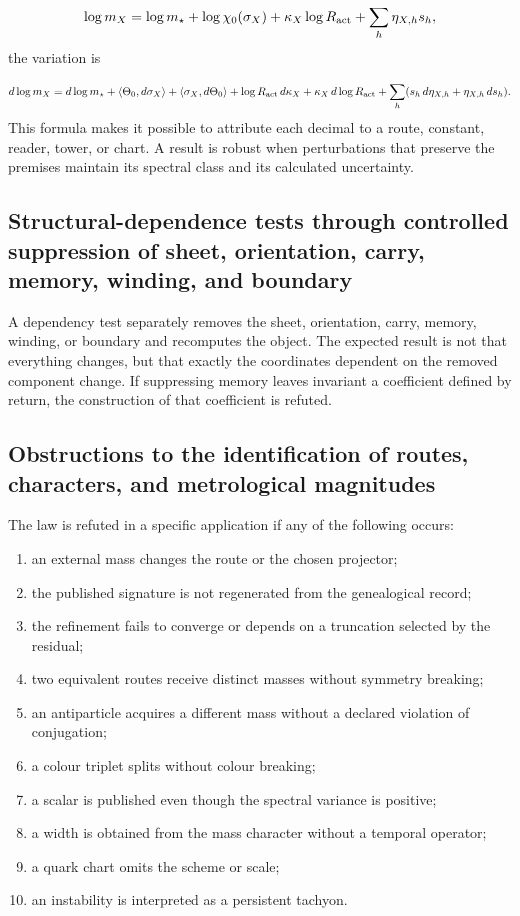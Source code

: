 \[
 \log m_X=
 \log m_\star+
 \log\chi_0(\sigma_X)
 +\kappa_X\log R_{\rm act}
 +\sum_h\eta_{X,h}s_h,
\]
the variation is

\[
 d\log m_X
 =d\log m_\star
 +\langle\Theta_0,d\sigma_X\rangle
 +\langle\sigma_X,d\Theta_0\rangle
 +\log R_{\rm act}\,d\kappa_X
 +\kappa_X\,d\log R_{\rm act}
 +\sum_h(s_h\,d\eta_{X,h}+\eta_{X,h}\,ds_h).
\]
This formula makes it possible to attribute each decimal to a route, constant, reader, tower, or chart. A result is robust when perturbations that preserve the premises maintain its spectral class and its calculated uncertainty.

\subsection{Structural-dependence tests through controlled suppression of sheet, orientation, carry, memory, winding, and boundary}
A dependency test separately removes the sheet, orientation, carry, memory, winding, or boundary and recomputes the object. The expected result is not that everything changes, but that exactly the coordinates dependent on the removed component change. If suppressing memory leaves invariant a coefficient defined by return, the construction of that coefficient is refuted.

\subsection{Obstructions to the identification of routes, characters, and metrological magnitudes}
The law is refuted in a specific application if any of the following occurs:

\begin{enumerate}
\item an external mass changes the route or the chosen projector;
\item the published signature is not regenerated from the genealogical record;
\item the refinement fails to converge or depends on a truncation selected by the residual;
\item two equivalent routes receive distinct masses without symmetry breaking;
\item an antiparticle acquires a different mass without a declared violation of conjugation;
\item a colour triplet splits without colour breaking;
\item a scalar is published even though the spectral variance is positive;
\item a width is obtained from the mass character without a temporal operator;
\item a quark chart omits the scheme or scale;
\item an instability is interpreted as a persistent tachyon.
\end{enumerate}
